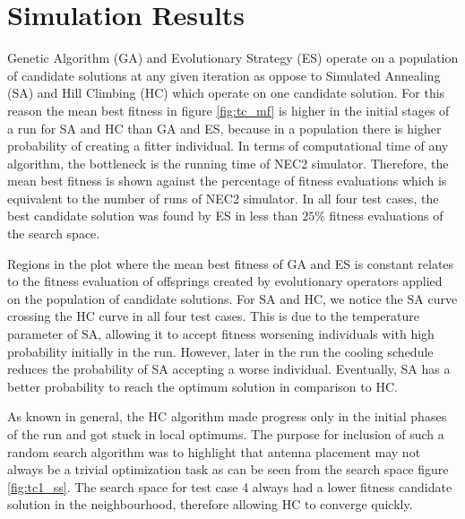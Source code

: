 \documentclass[conference]{IEEEtran}
\begin{document}
\section{Simulation Results}
\label{sec:results}
Genetic Algorithm (GA) and Evolutionary Strategy (ES) operate on a population of candidate solutions at any given iteration as oppose to Simulated Annealing (SA) and Hill Climbing (HC) which operate on one candidate solution. For this reason the mean best fitness in figure \ref{fig:tc_mf} is higher in the initial stages of a run for SA and HC than GA and ES, because in a population there is higher probability of creating a fitter individual. In terms of computational time of any algorithm, the bottleneck is the running time of NEC2 simulator. Therefore, the mean best fitness is shown against the percentage of fitness evaluations which is equivalent to the number of runs of NEC2 simulator. In all four test cases, the best candidate solution was found by ES in less than $25\%$ fitness evaluations of the search space. 

Regions in the plot where the mean best fitness of GA and ES is constant relates to the fitness evaluation of offsprings created by evolutionary operators applied on the population of candidate solutions. For SA and HC, we notice the SA curve crossing the HC curve in all four test cases. This is due to the temperature parameter of SA, allowing it to accept fitness worsening individuals with high probability initially in the run. However, later in the run the cooling schedule reduces the probability of SA accepting a worse individual. Eventually, SA has a better probability to reach the optimum solution in comparison to HC.

As known in general, the HC algorithm made progress only in the initial phases of the run and got stuck in local optimums. The purpose for inclusion of such a random search algorithm was to highlight that antenna placement may not always be a trivial optimization task as can be seen from the search space figure \ref{fig:tc1_ss}. The search space for test case 4 always had a lower fitness candidate solution in the neighbourhood, therefore allowing HC to converge quickly.
\end{document}
